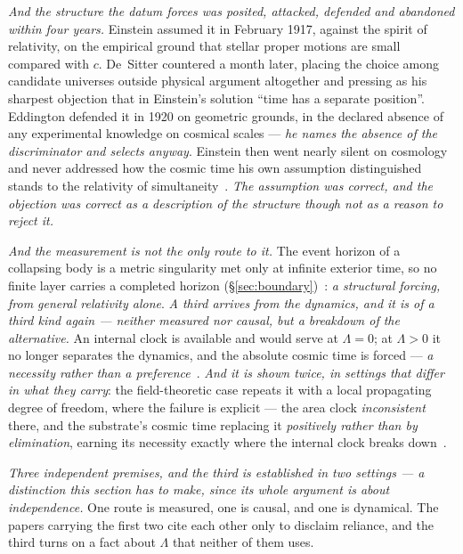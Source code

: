 \documentclass[11pt,a4paper]{article}
\theoremstyle{plain}
\theoremstyle{definition}
\begin{document}
\emph{And the structure the datum forces was posited, attacked, defended and abandoned within four years.}
Einstein assumed it in February 1917, against the spirit of relativity, on the empirical
ground that stellar proper motions are small compared with $c$. De~Sitter countered a month later, placing
the choice among candidate universes outside physical argument altogether and pressing as his sharpest
objection that in Einstein's solution ``time has a separate position''. Eddington defended it in 1920 on
geometric grounds, in the declared absence of any experimental knowledge on cosmical scales --- \emph{he names
the absence of the discriminator and selects anyway}. Einstein then went nearly silent on cosmology and never
addressed how the cosmic time his own assumption distinguished stands to the relativity of
simultaneity~\cite{JanzenModernParallax}. \emph{The assumption was correct, and the objection was correct as a
description of the structure though not as a reason to reject it.}

\emph{And the measurement is not the only route to it.} The event horizon of a collapsing body is a metric
singularity met only at infinite exterior time, so no finite layer carries a completed horizon
(\S\ref{sec:boundary})~\cite{JanzenBHcausality}: \emph{a structural forcing, from general relativity alone}.
\emph{A third arrives from the dynamics, and it is of a third kind again --- neither measured nor causal,
but a breakdown of the alternative.} An internal clock is available and would serve at $\Lambda=0$; at
$\Lambda>0$ it no longer separates the dynamics, and the absolute cosmic time is forced --- \emph{a necessity
rather than a preference}~\cite{JanzenCanonicalTime}. \emph{And it is shown twice, in settings that differ
in what they carry}: the field-theoretic case repeats it with a local propagating degree of freedom, where
the failure is explicit --- the area clock \emph{inconsistent} there, and the substrate's cosmic time
replacing it \emph{positively rather than by elimination}, earning its necessity exactly where the internal
clock breaks down~\cite{JanzenDynamics}.

\emph{Three independent premises, and the third is established in two settings --- a distinction this
section has to make, since its whole argument is about independence.} One route is measured, one is causal,
and one is dynamical. The papers carrying the first two cite each other only to disclaim reliance, and the
third turns on a fact about $\Lambda$ that neither of them uses.
\end{document}
